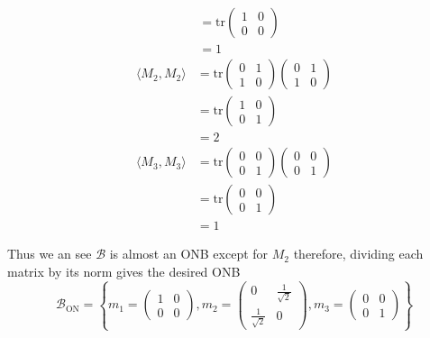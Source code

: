 \documentclass[a4paper, 11pt]{article}
\newenvironment{solution}{%
	\begin{list}{}{%
			\setlength{\topsep}{0pt}%
			\setlength{\leftmargin}{1.5cm}%
			\setlength{\rightmargin}{1.5cm}%
			\setlength{\listparindent}{\parindent}%
			\setlength{\itemindent}{\parindent}%
			\setlength{\parsep}{\parskip}%
		}%
		\item[]}{\end{list}}
\begin{document}
\begin{solution}
\begin{align*}
      &=\text{tr}\begin{pmatrix} 1 & 0 \\ 0 & 0 \end{pmatrix} \\
      &= 1 
  \end{align*}
\begin{align*}
    \langle M_2, M_2 \rangle &= \text{tr}\begin{pmatrix}0 & 1 \\ 1 & 0\end{pmatrix}\begin{pmatrix}0 & 1 \\ 1 & 0 \end{pmatrix} \\
      &=\text{tr}\begin{pmatrix} 1 & 0 \\ 0 & 1 \end{pmatrix} \\
      &= 2 
  \end{align*}
\begin{align*}
    \langle M_3, M_3 \rangle &= \text{tr}\begin{pmatrix}0 & 0 \\ 0 & 1\end{pmatrix}\begin{pmatrix}0 & 0 \\ 0 & 1 \end{pmatrix} \\
      &=\text{tr}\begin{pmatrix} 0 & 0 \\ 0 & 1 \end{pmatrix} \\
      &= 1 
  \end{align*}

\noindent Thus we an see $\mathcal{B}$ is almost an ONB except for $M_2$ therefore, dividing each matrix by its norm gives the desired ONB
\begin{equation*}
  \mathcal{B}_\text{ON} = \left\{ m_1=\begin{pmatrix} 1 & 0 \\ 0 & 0 \end{pmatrix}, m_2=\begin{pmatrix} 0 & \frac{1}{\sqrt{2}} \\ \frac{1}{\sqrt{2}} & 0 \end{pmatrix}, m_3=\begin{pmatrix}0 & 0 \\ 0 & 1 \end{pmatrix}   \right\}
\end{equation*}


\end{solution}
\end{document}

